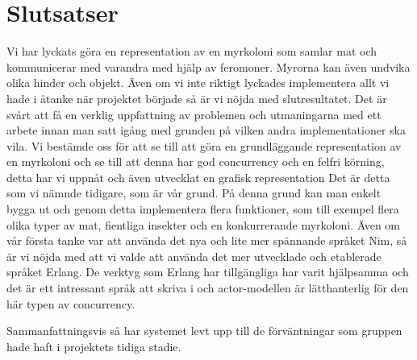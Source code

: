\chapter{Slutsatser}

\label{Slutsats} 


Vi har lyckats göra en representation av en myrkoloni som samlar mat och kommunicerar med varandra med hjälp av feromoner. Myrorna kan även undvika olika hinder och objekt.  Även om vi inte riktigt lyckades implementera allt vi hade i åtanke när projektet började så är vi nöjda med slutresultatet. Det är svårt att få en verklig uppfattning av problemen och utmaningarna med ett arbete innan man satt igång med grunden på vilken andra implementationer ska vila. 
Vi bestämde oss för att se till att göra en grundläggande representation av en myrkoloni och se till att denna har god concurrency och en felfri körning, detta har vi uppnåt och även utvecklat en grafisk representation  Det är detta som vi nämnde tidigare, som är vår grund. På denna grund kan man enkelt bygga ut och genom detta implementera flera funktioner, som till exempel flera olika typer av mat, fientliga insekter och en konkurrerande myrkoloni.
Även om vår första tanke var att använda det nya och lite mer spännande språket Nim, så är vi nöjda med att vi valde att använda det mer utvecklade och etablerade språket Erlang. De verktyg som Erlang har tillgängliga har varit hjälpsamma och det är ett intressant språk att skriva i och actor-modellen är lätthanterlig för den här typen av concurrency.  

Sammanfattningsvis så har systemet levt upp till de förväntningar som gruppen hade haft i projektets tidiga stadie. 
